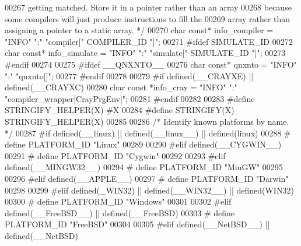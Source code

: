 \begin{DoxyCode}
{{{{{{{{{{{{{{{{{{{{{{{{{{{{{{{{{{{00267 \textcolor{comment}{   getting matched.  Store it in a pointer rather than an array}
00268 \textcolor{comment}{   because some compilers will just produce instructions to fill the}
00269 \textcolor{comment}{   array rather than assigning a pointer to a static array.  */}
00270 \textcolor{keywordtype}{char} \textcolor{keyword}{const}* info_compiler = \textcolor{stringliteral}{"INFO"} \textcolor{stringliteral}{":"} \textcolor{stringliteral}{"compiler["} COMPILER_ID \textcolor{stringliteral}{"]"};
00271 \textcolor{preprocessor}{#ifdef SIMULATE\_ID}
00272 \textcolor{keywordtype}{char} \textcolor{keyword}{const}* info\_simulate = \textcolor{stringliteral}{"INFO"} \textcolor{stringliteral}{":"} \textcolor{stringliteral}{"simulate["} SIMULATE\_ID \textcolor{stringliteral}{"]"};
00273 \textcolor{preprocessor}{#endif}
00274 
00275 \textcolor{preprocessor}{#ifdef \_\_QNXNTO\_\_}
00276 \textcolor{keywordtype}{char} \textcolor{keyword}{const}* qnxnto = \textcolor{stringliteral}{"INFO"} \textcolor{stringliteral}{":"} \textcolor{stringliteral}{"qnxnto[]"};
00277 \textcolor{preprocessor}{#endif}
00278 
00279 \textcolor{preprocessor}{#if defined(\_\_CRAYXE) || defined(\_\_CRAYXC)}
00280 \textcolor{keywordtype}{char} \textcolor{keyword}{const} *info\_cray = \textcolor{stringliteral}{"INFO"} \textcolor{stringliteral}{":"} \textcolor{stringliteral}{"compiler\_wrapper[CrayPrgEnv]"};
00281 \textcolor{preprocessor}{#endif}
00282 
00283 \textcolor{preprocessor}{#define STRINGIFY\_HELPER(X) #X}
00284 \textcolor{preprocessor}{#define STRINGIFY(X) STRINGIFY\_HELPER(X)}
00285 
00286 \textcolor{comment}{/* Identify known platforms by name.  */}
00287 \textcolor{preprocessor}{#if defined(\_\_linux) || defined(\_\_linux\_\_) || defined(linux)}
00288 \textcolor{preprocessor}{# define PLATFORM\_ID "Linux"}
00289 
00290 \textcolor{preprocessor}{#elif defined(\_\_CYGWIN\_\_)}
00291 \textcolor{preprocessor}{# define PLATFORM\_ID "Cygwin"}
00292 
00293 \textcolor{preprocessor}{#elif defined(\_\_MINGW32\_\_)}
00294 \textcolor{preprocessor}{# define PLATFORM\_ID "MinGW"}
00295 
00296 \textcolor{preprocessor}{#elif defined(\_\_APPLE\_\_)}
00297 \textcolor{preprocessor}{# define PLATFORM\_ID "Darwin"}
00298 
00299 \textcolor{preprocessor}{#elif defined(\_WIN32) || defined(\_\_WIN32\_\_) || defined(WIN32)}
00300 \textcolor{preprocessor}{# define PLATFORM\_ID "Windows"}
00301 
00302 \textcolor{preprocessor}{#elif defined(\_\_FreeBSD\_\_) || defined(\_\_FreeBSD)}
00303 \textcolor{preprocessor}{# define PLATFORM\_ID "FreeBSD"}
00304 
00305 \textcolor{preprocessor}{#elif defined(\_\_NetBSD\_\_) || defined(\_\_NetBSD)}
}}}}}}}}}}}}}}}}}}}}}}}}}}}}}}}}}}}
\end{DoxyCode}
